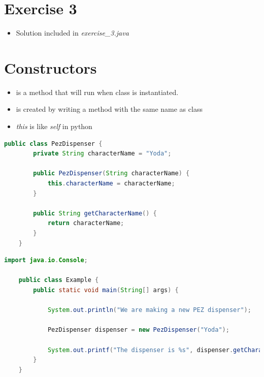 \documentclass[12pt]{article}
\begin{document}
\bigskip

\section{Exercise 3}

\bigskip

\begin{itemize}
    \item Solution included in \textit{exercise\_3.java}
\end{itemize}

\bigskip

\section{Constructors}

\bigskip

\begin{itemize}
    \item is a method that will run when class is instantiated.
    \item is created by writing a method with the same name as class
    \item \textit{this} is like \textit{self} in python
\end{itemize}


    \begin{lstlisting}[language=Java,caption={lesson\_9/PezDispenser.java}]
    public class PezDispenser {
        private String characterName = "Yoda";

        public PezDispenser(String characterName) {
            this.characterName = characterName;
        }

        public String getCharacterName() {
            return characterName;
        }
    }
    \end{lstlisting}

    \bigskip

    \begin{lstlisting}[language=Java,caption={lesson\_9/Example.java}]
    import java.io.Console;

    public class Example {
        public static void main(String[] args) {

            System.out.println("We are making a new PEZ dispenser");

            PezDispenser dispenser = new PezDispenser("Yoda");

            System.out.printf("The dispenser is %s", dispenser.getCharacterName()); // <- 2. And is used here
        }
    }
    \end{lstlisting}
\end{document}
